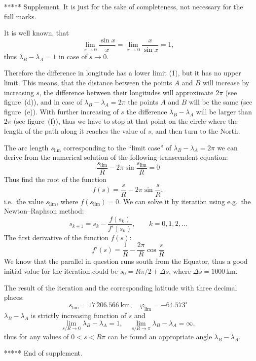 \begin{description}
  ***** Supplement. It is just for the sake of completeness, not necessary for
  the full marks.

  It is well known, that
  \[
    \lim_{x\to 0}\frac{\sin x}{x} = \lim_{x\to 0}\frac{x}{\sin x} = 1,
    \tag{10.8}
  \]
  thus $\lambda_B - \lambda_A = 1$ in case of $s \to 0$.

  Therefore the difference in longitude has a lower limit (1), but it has no
  upper limit. This means, that the distance between the points $A$ and $B$
  will increase by increasing $s$, the difference between their longitudes will
  approximate $2\pi$ (see figure~(d)), and in case of
  $\lambda_B - \lambda_A = 2\pi$ the points $A$ and $B$ will be the same (see
  figure~(e)). With further increasing of $s$ the difference
  $\lambda_B - \lambda_A$ will be larger than $2\pi$ (see figure~(f)), thus we
  have to stop at that point on the circle where the length of the path along
  it reaches the value of $s$, and then turn to the North.


  The arc length $s_{\lim}$ corresponding to the ``limit case'' of
  $\lambda_B - \lambda_A = 2\pi$ we can derive from the numerical solution of
  the following transcendent equation:
  \[
    \frac{s_{\lim}}{R} - 2\pi\sin\frac{s_{\lim}}{R} = 0
  \]
  Thus find the root of the function
  \[
    f(s) = \frac{s}{R} - 2\pi\sin\frac{s}{R},
  \]
  i.e.\ the value $s_{\lim}$, where $f(s_{\lim}) = 0$. We can solve it by
  iteration using e.g.\ the Newton--Raphson method:
  \[
    s_{k+1} = s_k - \frac{f(s_k)}{f'(s_k)}, \qquad k = 0, 1, 2, \ldots
  \]
  The first derivative of the function $f(s)$:
  \[
    f'(s) = \frac{1}{R} - \frac{2\pi}{R}\cos\frac{s}{R}
  \]
  We know that the parallel in question runs south from the Equator, thus a
  good initial value for the iteration could be $s_0 = R\pi/2 + \Delta s$,
  where $\Delta s = 1000$\,km.

  The result of the iteration and the corresponding latitude with three decimal
  places:
  \[
    s_{\lim} = 17\,206.566\ \mathrm{km}, \quad
    \varphi_{\lim} = -64.573^\circ
  \]
  $\lambda_B - \lambda_A$ is strictly increasing function of $s$ and
  \[
    \lim_{s/R\to 0} \lambda_B - \lambda_A = 1, \quad
    \lim_{s/R\to \pi} \lambda_B - \lambda_A = \infty, \tag{10.9}
  \]
  thus for any values of $0 < s < R\pi$ can be found an appropriate angle
  $\lambda_B - \lambda_A$.


  ***** End of supplement.


\end{description}
